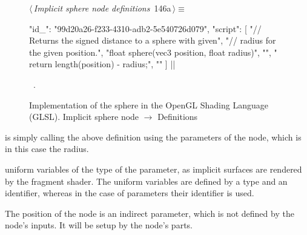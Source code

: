 \documentclass[%
    a4paper,    %
    justified,  %
    nobib,      %
    openany     %
]{tufte-book}
\makeatletter
\renewcommand{\label}[1]{\@tufte@label{##1}}%
\makeatother
\begin{document}
\begin{figure}[!htbp]
\begin{flushleft} \small
\begin{minipage}{\linewidth}\label{scrap101}\raggedright\small
{} $\langle\,${\itshape Implicit sphere node definitions}\nobreak\ {\footnotesize {146a}}$\,\rangle\equiv$
\vspace{-1ex}
\begin{pythoncode}
{
    "id_": "99d20a26-f233-4310-adb2-5e540726d079",
    "script": [
        "// Returns the signed distance to a sphere with given",
        "// radius for the given position.",
        "float sphere(vec3 position, float radius)",
        "{",
        "    return length(position) - radius;",
        "}"
    ]
}|\NWsep|
\end{pythoncode}
\vspace{1.5ex}
\footnotesize
\begin{list}{}{\setlength{\itemsep}{-\parsep}\setlength{\itemindent}{-\leftmargin}}
\item \NWtxtMacroRefIn\ .

\item{}
\end{list}
\end{minipage}\vspace{4ex}
\end{flushleft}
\caption{Implementation of the sphere in the OpenGL Shading Language (GLSL).
  \newline{}\newline{}Implicit sphere node $\rightarrow$ Definitions}
\end{figure}

 is simply calling the above definition
using the parameters of the node, which is in this case the radius.

 uniform variables
of the type of the parameter, as implicit surfaces are rendered by the fragment
shader. The uniform variables are defined by a type and an identifier, whereas
in the case of parameters their identifier is used.

The position of the node is an indirect parameter, which is not defined by the
node's inputs. It will be setup by the node's parts.
\end{document}
